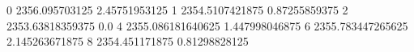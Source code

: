 0 2356.095703125 2.45751953125
1 2354.5107421875 0.87255859375
2 2353.63818359375 0.0
4 2355.086181640625 1.447998046875
6 2355.783447265625 2.145263671875
8 2354.451171875 0.81298828125
